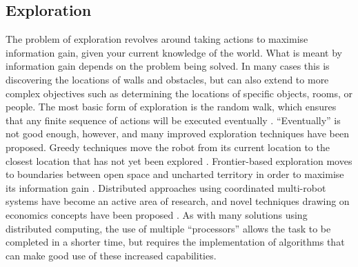 \documentclass[conference]{IEEEtran}
\begin{document}
\subsection{Exploration}
The problem of exploration revolves around taking actions to maximise information gain, given your current knowledge of the world. What is meant by information gain depends on the problem being solved. In many cases this is discovering the locations of walls and obstacles, but can also extend to more complex objectives such as determining the locations of specific objects, rooms, or people. The most basic form of exploration is the random walk, which ensures that any finite sequence of actions will be executed eventually \cite{thrunexploration}. ``Eventually'' is not good enough, however, and many improved exploration techniques have been proposed. Greedy techniques move the robot from its current location to the closest location that has not yet been explored \cite{greedy}. Frontier-based exploration moves to boundaries between open space and uncharted territory in order to maximise its information gain \cite{frontier}. Distributed approaches using coordinated multi-robot systems have become an active area of research, and novel techniques drawing on economics concepts have been proposed \cite{multiexp, marketexp}. As with many solutions using distributed computing, the use of multiple ``processors'' allows the task to be completed in a shorter time, but requires the implementation of algorithms that can make good use of these increased capabilities.
\end{document}
